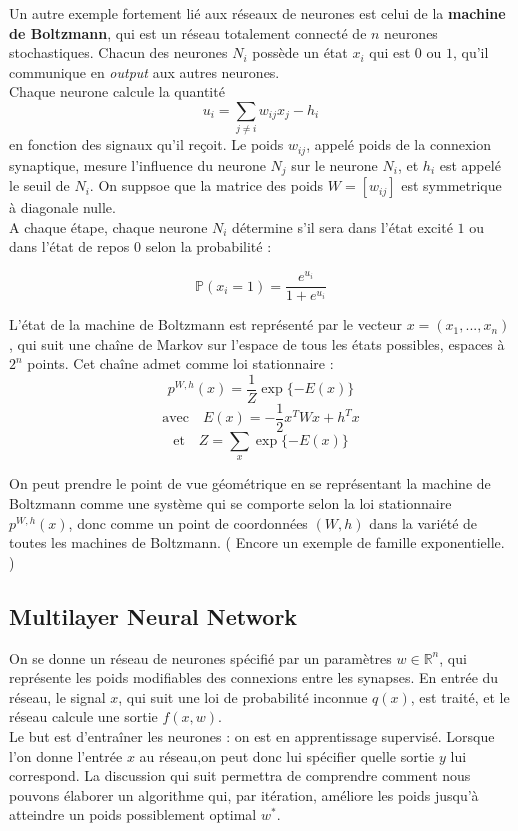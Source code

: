 \documentclass{article}
\newcommand{\R}{\mathbb R}
\begin{document}
Un autre exemple fortement lié aux réseaux de neurones est celui de la \textbf{machine de Boltzmann}, qui est un réseau totalement connecté de $n$ neurones stochastiques. Chacun des neurones $N_i$ possède un état $x_i$ qui est $0$ ou $1$, qu'il communique en \textit{output} aux autres neurones. \\
Chaque neurone calcule la quantité
\[u_i=\sum_{j \neq i} w_{ij}x_j-h_i\]
en fonction des signaux qu'il reçoit. Le poids $w_{ij}$, appelé poids de la connexion synaptique, mesure l'influence du neurone $N_j$ sur le neurone $N_i$, et $h_i$ est appelé le seuil de $N_i$. On suppsoe que la matrice des poids $W= [w_{ij}]$ est symmetrique à diagonale nulle.\\
A chaque étape, chaque neurone $N_i$ détermine s'il sera dans l'état excité $1$ ou dans l'état de repos $0$ selon la probabilité :

\[\mathbb P(x_i=1)=\frac{e^{u_i}}{1+e^{u_i}}\]

L'état de la machine de Boltzmann est représenté par le vecteur $x=(x_1,...,x_n)$, qui suit une chaîne de Markov sur l'espace de tous les états possibles, espaces à $2^n$ points. Cet chaîne admet comme loi stationnaire :
\[p^{W,h}(x)=\frac{1}{Z}\exp\{-E(x)\}\]
\[\text{avec} \quad E(x)=-\frac{1}{2}x^TWx +h^Tx\]
\[\text{et} \quad Z=\sum_x \exp\{-E(x)\}\]

On peut prendre le point de vue géométrique en se représentant la machine de Boltzmann comme une système qui se comporte selon la loi stationnaire $p^{W,h}(x)$, donc comme un point de coordonnées $(W,h)$ dans la variété de toutes les machines de Boltzmann. ( Encore un exemple de famille exponentielle. )

\subsection{Multilayer Neural Network}

On se donne un réseau de neurones spécifié par un paramètres $w\in \R^n$, qui représente les poids modifiables des connexions entre les synapses. En entrée du réseau, le signal $x$, qui suit une loi de probabilité inconnue $q(x)$, est traité, et le réseau calcule une sortie $f(x,w)$. \\

Le but est d'entraîner les neurones : on est en apprentissage supervisé. Lorsque l'on donne l'entrée $x$ au réseau,on peut donc lui spécifier quelle sortie $y$ lui correspond. La discussion qui suit permettra de comprendre comment nous pouvons élaborer un algorithme qui, par itération, améliore les poids jusqu'à atteindre un poids possiblement optimal $w^*$.\\
\end{document}
